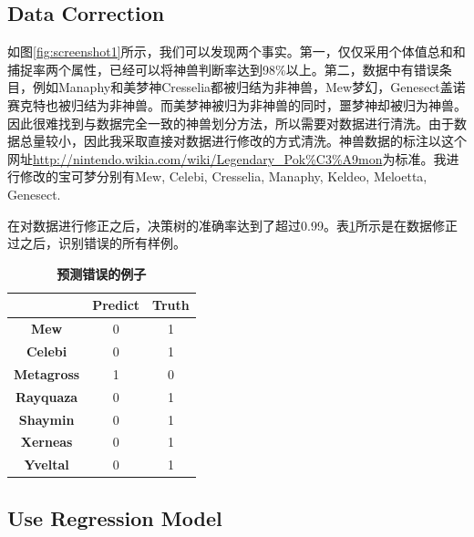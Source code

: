 \documentclass[a4paper, cs4size, oneside]{article}
\begin{document}
\subsection{Data Correction}

如图\ref{fig:screenshot1}所示，我们可以发现两个事实。第一，仅仅采用个体值总和和捕捉率两个属性，已经可以将神兽判断率达到98\%以上。第二，数据中有错误条目，例如Manaphy和美梦神Cresselia都被归结为非神兽，Mew梦幻，Genesect盖诺赛克特也被归结为非神兽。而美梦神被归为非神兽的同时，噩梦神却被归为神兽。因此很难找到与数据完全一致的神兽划分方法，所以需要对数据进行清洗。由于数据总量较小，因此我采取直接对数据进行修改的方式清洗。神兽数据的标注以这个网址\url{http://nintendo.wikia.com/wiki/Legendary_Pok%C3%A9mon}为标准。我进行修改的宝可梦分别有Mew, Celebi, Cresselia, Manaphy, Keldeo, Meloetta, Genesect.

在对数据进行修正之后，决策树的准确率达到了超过0.99。表\ref{tab:result1}所示是在数据修正过之后，识别错误的所有样例。

\begin{table}[]
\centering
\caption{\textbf{预测错误的例子}}
\label{tab:result1}
\begin{tabular}{ccc}
\hline
\multicolumn{1}{l}{\textbf{}} & \textbf{Predict} & \textbf{Truth} \\ \hline
\textbf{Mew}                  & 0                & 1              \\
\textbf{Celebi}               & 0                & 1              \\
\textbf{Metagross}            & 1                & 0              \\
\textbf{Rayquaza}             & 0                & 1              \\
\textbf{Shaymin}              & 0                & 1              \\
\textbf{Xerneas}              & 0                & 1              \\
\textbf{Yveltal}              & 0                & 1              \\ \hline
\end{tabular}
\end{table}

\subsection{Use Regression Model}
\end{document}
